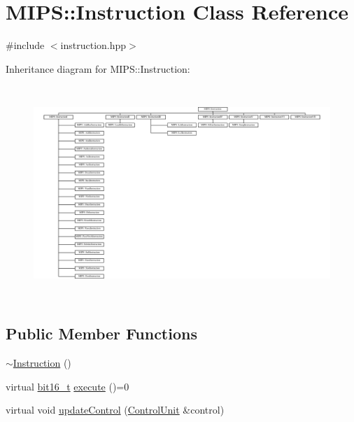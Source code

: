 \hypertarget{classMIPS_1_1Instruction}{}\section{M\+I\+PS\+:\+:Instruction Class Reference}
\label{classMIPS_1_1Instruction}


{\ttfamily \#include $<$instruction.\+hpp$>$}

Inheritance diagram for M\+I\+PS\+:\+:Instruction\+:\begin{figure}[H]
\begin{center}
\leavevmode
\includegraphics[height=8.099935cm]{classMIPS_1_1Instruction}
\end{center}
\end{figure}
\subsection*{Public Member Functions}
\begin{DoxyCompactItemize}
\item 
\hyperlink{classMIPS_1_1Instruction_ab99cb1c89cd950412585375681b1466d}{$\sim$\+Instruction} ()
\item 
virtual \hyperlink{core_8hpp_adc265a970bc35995b5879784bbb3f1b7}{bit16\+\_\+t} \hyperlink{classMIPS_1_1Instruction_a88668dfaf49dd8608f210ba13948d242}{execute} ()=0
\item 
virtual void \hyperlink{classMIPS_1_1Instruction_a7df847adef2997446ffca9b71c2f3112}{update\+Control} (\hyperlink{classMIPS_1_1ControlUnit}{Control\+Unit} \&control)
\end{DoxyCompactItemize}
